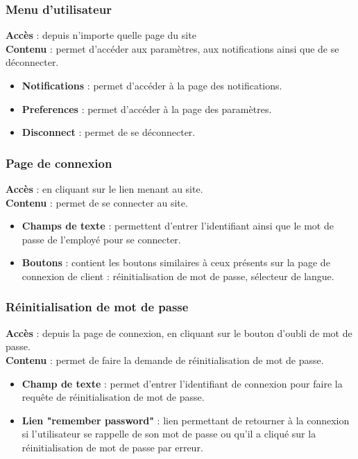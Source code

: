 \documentclass[../rapport.tex]{subfiles}
\begin{document}
\subsubsection{Menu d'utilisateur}
\noindent \textbf{Accès} : depuis n'importe quelle page du site \\
\textbf{Contenu }: permet d'accéder aux paramètres, aux notifications ainsi que de se déconnecter.
\begin{itemize}
    \item \textbf{Notifications} : permet d'accéder à la page des notifications. 
    \item \textbf{Preferences} : permet d'accéder à la page des paramètres.
    \item \textbf{Disconnect} : permet de se déconnecter.
\end{itemize}

\subsubsection{Page de connexion}
\noindent \textbf{Accès} :  en cliquant sur le lien menant au site.\\
\textbf{Contenu }: permet de se connecter au site.
\begin{itemize} 
    \item \textbf{Champs de texte} : permettent d'entrer l'identifiant ainsi que le mot de passe de l'employé pour se connecter.
    \item \textbf{Boutons} : contient les boutons similaires à ceux présents sur la page de connexion de client : réinitialisation de mot de passe, sélecteur de langue.
\end{itemize}

\subsubsection{Réinitialisation de mot de passe}
\noindent \textbf{Accès} :  depuis la page de connexion, en cliquant sur le bouton d'oubli de mot de passe.\\
\textbf{Contenu }: permet de faire la demande de réinitialisation de mot de passe.
\begin{itemize}
    \item \textbf{Champ de texte} : permet d'entrer l'identifiant de connexion pour faire la requête de réinitialisation de mot de passe.
    \item \textbf{Lien "remember password"} : lien permettant de retourner à la connexion si l'utilisateur se rappelle de son mot de passe ou qu'il a cliqué sur la réinitialisation de mot de passe par erreur.
\end{itemize}
\end{document}

